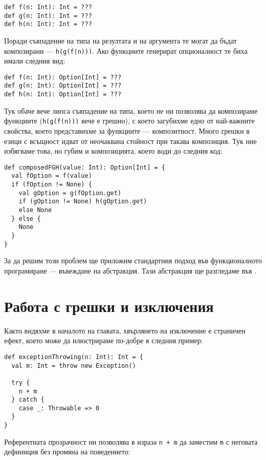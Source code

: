 \begin{lstlisting}
def f(n: Int): Int = ???
def g(n: Int): Int = ???
def h(n: Int): Int = ???
\end{lstlisting}

Поради съвпадение на типа на резултата и на аргумента те могат да бъдат композирани — \lstinline|h(g(f(n)))|. Ако функциите генерират опционалност те биха имали следния вид:

\begin{lstlisting}
def f(n: Int): Option[Int] = ???
def g(n: Int): Option[Int] = ???
def h(n: Int): Option[Int] = ???
\end{lstlisting}

Тук обаче вече липса съвпадение на типа, което не ни позволява да композираме функциите (\lstinline|h(g(f(n)))| вече е грешно), с което загубихме едно от най-важните свойства, което представихме за функциите — композитност. Много грешки в езици с  всъщност идват от неочаквана  стойност при такава композиция. Тук ние избягваме това, но губим и композицията, което води до следния код:

\begin{lstlisting}
def composedFGH(value: Int): Option[Int] = {
  val fOption = f(value)
  if (fOption != None) {
    val gOption = g(fOption.get)
    if (gOption != None) h(gOption.get)
    else None
  } else {
    None
  }
}
\end{lstlisting}

За да решим този проблем ще приложим стандартния подход във функционалното програмиране — въвеждане на абстракция. Тази абстракция ще разгледаме във .

\section{Работа с грешки и изключения}

Както видяхме в началото на главата, хвърлянето на изключение е страничен ефект, което може да илюстрираме по-добре в следния пример:

\begin{lstlisting}
def exceptionThrowing(n: Int): Int = {
  val m: Int = throw new Exception()
  
  try {
    n + m
  } catch {
    case _: Throwable => 0
  }
}
\end{lstlisting}

Референтната прозрачност ни позволява в израза \lstinline|n + m| да заместим \lstinline|m| с неговата дефиниция без промяна на поведението:

